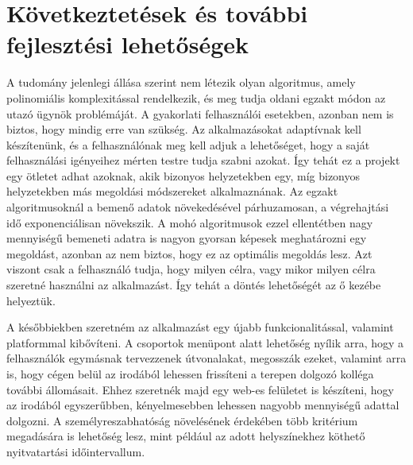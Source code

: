 \chapter{Következtetések és további fejlesztési lehetőségek}\label{ch:ALAP}

A tudomány jelenlegi állása szerint nem létezik olyan algoritmus, amely polinomiális komplexitással rendelkezik, és meg tudja oldani egzakt módon az utazó ügynök problémáját. A gyakorlati felhasználói esetekben, azonban nem is biztos, hogy mindig erre van szükség. Az alkalmazásokat adaptívnak kell készítenünk, és a felhasználónak meg kell adjuk a lehetőséget, hogy a saját felhasználási igényeihez mérten testre tudja szabni azokat. Így tehát ez a projekt egy ötletet adhat azoknak, akik bizonyos helyzetekben egy, míg bizonyos helyzetekben más megoldási módszereket alkalmaznának. Az egzakt algoritmusoknál a bemenő adatok növekedésével párhuzamosan, a végrehajtási idő exponenciálisan növekszik. A mohó algoritmusok ezzel ellentétben nagy mennyiségű bemeneti adatra is nagyon gyorsan képesek meghatározni egy megoldást, azonban az nem biztos, hogy ez az optimális megoldás lesz. Azt viszont csak a felhasználó tudja, hogy milyen célra, vagy mikor milyen célra szeretné használni az alkalmazást. Így tehát a döntés lehetőségét az ő kezébe helyeztük.

A későbbiekben szeretném az alkalmazást egy újabb funkcionalitással, valamint platformmal kibővíteni. A csoportok menüpont alatt lehetőség nyílik arra, hogy a felhasználók egymásnak tervezzenek útvonalakat, megosszák ezeket, valamint arra is, hogy cégen belül az irodából lehessen frissíteni a terepen dolgozó kolléga további állomásait. Ehhez szeretnék majd egy web-es felületet is készíteni, hogy az irodából egyszerűbben, kényelmesebben lehessen nagyobb mennyiségű adattal dolgozni. A személyreszabhatóság növelésének érdekében több kritérium megadására is lehetőség lesz, mint például az adott helyszínekhez köthető nyitvatartási időintervallum.
